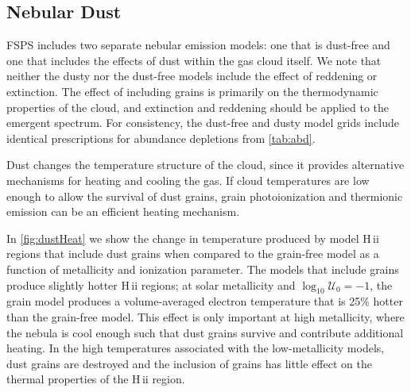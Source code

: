 \documentclass[linenumbers, trackchanges, tighten]{aastex61}%
\newcommand{\Fig}[1]{\autoref{fig:#1}}
\newcommand{\Tab}[1]{\autoref{tab:#1}}
\newcommand{\FSPS}{{\sc FSPS}\xspace}
\newcommand{\logten}{\ensuremath{\log_{10}}}
\newcommand{\hii}{H\,{\sc ii}\xspace}
\newcommand{\logU}{\ensuremath{\logten \mathcal{U}_0}}
\begin{document}
\subsection{Nebular Dust}\label{sec:secondary:dust}

\FSPS includes two separate nebular emission models: one that is dust-free and one that includes the effects of dust within the gas cloud itself. We note that neither the dusty nor the dust-free models include the effect of reddening or extinction. The effect of including grains is primarily on the thermodynamic properties of the cloud, and extinction and reddening should be applied to the emergent spectrum. For consistency, the dust-free and dusty model grids include identical prescriptions for abundance depletions from \Tab{abd}.

Dust changes the temperature structure of the cloud, since it provides alternative mechanisms for heating and cooling the gas. If cloud temperatures are low enough to allow the survival of dust grains, grain photoionization and thermionic emission can be an efficient heating mechanism. 

In \Fig{dustHeat} we show the change in temperature produced by model \hii regions that include dust grains when compared to the grain-free model as a function of metallicity and ionization parameter. The models that include grains produce slightly hotter \hii regions; at solar metallicity and $\logU = -1$, the grain model produces a volume-averaged electron temperature that is 25\% hotter than the grain-free model. This effect is only important at high metallicity, where the nebula is cool enough such that dust grains survive and contribute additional heating. In the high temperatures associated with the low-metallicity models, dust grains are destroyed and the inclusion of grains has little effect on the thermal properties of the \hii region. 
\end{document}
